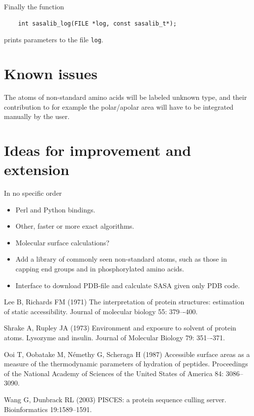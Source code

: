 \documentclass[a4paper,11pt]{article}
\begin{document}
Finally the function 
\begin{verbatim}
    int sasalib_log(FILE *log, const sasalib_t*);
\end{verbatim}
prints parameters to the file \verb|log|.

\section{Known issues}

The atoms of non-standard amino acids will be labeled unknown type,
and their contribution to for example the polar/apolar area will have
to be integrated manually by the user.

\section{Ideas for improvement and extension}

In no specific order
\begin{itemize}
\item Perl and Python bindings.
\item Other, faster or more exact algorithms.
\item Molecular surface calculations?
\item Add a library of commonly seen non-standard atoms, such as those
  in capping end groups and in phosphorylated amino acids.
\item Interface to download PDB-file and calculate SASA given only PDB
  code.
\end{itemize}

\begin{thebibliography}{50}

  Lee B, Richards FM (1971) The interpretation of protein
  structures: estimation of static accessibility. Journal of molecular
  biology 55: 379–-400.

  Shrake A, Rupley JA (1973) Environment and exposure to
  solvent of protein atoms. Lysozyme and insulin. Journal of Molecular
  Biology 79: 351–-371.

  Ooi T, Oobatake M, Némethy G, Scheraga H (1987)
  Accessible surface areas as a measure of the thermodynamic
  parameters of hydration of peptides. Proceedings of the National
  Academy of Sciences of the United States of America 84: 3086–3090.

  Wang G, Dunbrack RL (2003) PISCES: a protein sequence culling server. 
  Bioinformatics 19:1589--1591.

\end{thebibliography}
\end{document}
